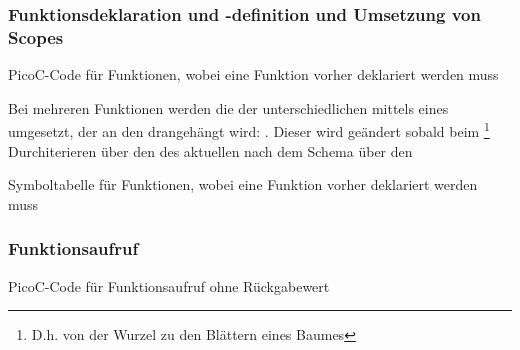 \subsubsection{Funktionsdeklaration und -definition und Umsetzung von Scopes}
\begin{code}
  \centering
  \caption{PicoC-Code für Funktionen, wobei eine Funktion vorher deklariert werden muss}
  \label{code:picoc_code_für_funktionen_picoc_code_für_funktionen_wobei_eine_funktion_vorher_deklariert_werden_muss}
\end{code}

Bei mehreren Funktionen werden die  der unterschiedlichen  mittels eines   umgesetzt, der an den   drangehängt wird: . Dieser  wird geändert sobald beim \footnote{D.h. von der Wurzel zu den Blättern eines Baumes} Durchiterieren über den  des aktuellen  nach dem  Schema über den

\begin{code}
  \centering
  \caption{Symboltabelle für Funktionen, wobei eine Funktion vorher deklariert werden muss}
  \label{code:symboltabelle_für_funktionen_picoc_code_für_funktionen_wobei_eine_funktion_vorher_deklariert_werden_muss}
\end{code}

\subsubsection{Funktionsaufruf}


\begin{code}
  \centering
  \caption{PicoC-Code für Funktionsaufruf ohne Rückgabewert}
  \label{code:picoc_code_für_funktionsaufruf_ohne_rückgabewert}
\end{code}

